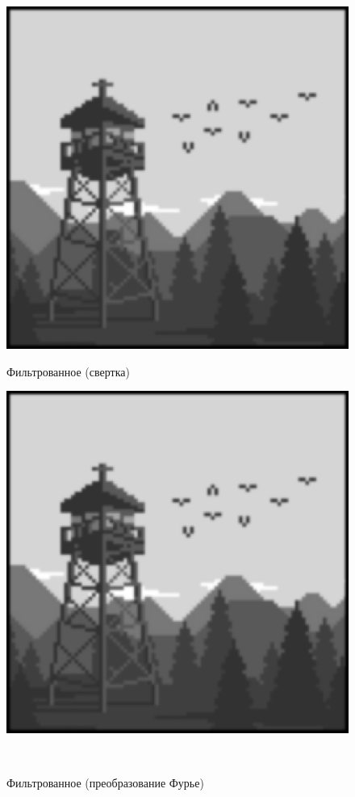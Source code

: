 \documentclass[a4paper]{article}
\begin{document}
\begin{figure}[H]
    \begin{minipage}{0.49\textwidth}
        \centering \includegraphics[width=\textwidth]{2/11_img_gaussian_by_conv2.png}
        \caption{Фильтрованное (свертка)}
    \end{minipage}\hfill
    \begin{minipage}{0.49\textwidth}
        \centering \includegraphics[width=\textwidth]{2/11_img_gaussian_by_fourier.png}
        \caption{Фильтрованное (преобразование Фурье)}
    \end{minipage}\\[1em]
\end{figure}\noindent\
\end{document}
